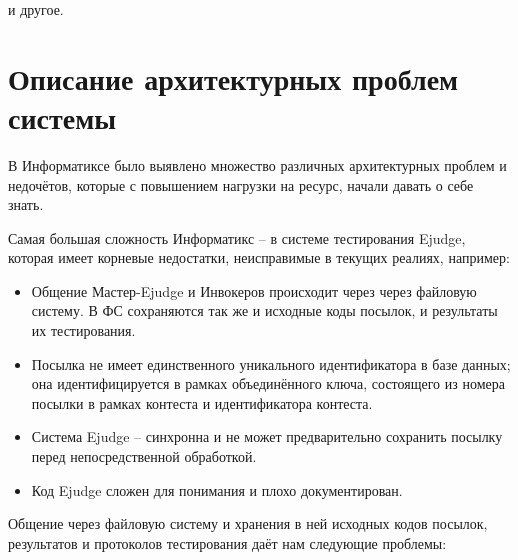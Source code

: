 и другое.


\section{Описание архитектурных проблем системы}

В Информатиксе было выявлено множество различных архитектурных проблем и недочётов, 
которые с повышением нагрузки на ресурс, начали давать о себе знать.

Самая большая сложность Информатикс -- в системе тестирования Ejudge, которая имеет корневые недостатки, неисправимые в текущих реалиях, например:
\begin{itemize}
    \item Общение Мастер-Ejudge и Инвокеров происходит через через файловую систему\cite{ejudge_jobs}. 
    В ФС сохраняются так же и исходные коды посылок, и результаты их тестирования.
    \item Посылка не имеет единственного уникального идентификатора в базе данных; она идентифицируется в рамках объединённого ключа, состоящего из номера посылки в рамках контеста и идентификатора контеста.
    \item Система Ejudge -- синхронна и не может предварительно сохранить посылку перед непосредственной обработкой.
    \item Код Ejudge сложен для понимания и плохо документирован\cite{ejudge_source}.
\end{itemize}

Общение через файловую систему и хранения в ней исходных кодов посылок, результатов и протоколов тестирования даёт нам следующие проблемы:

